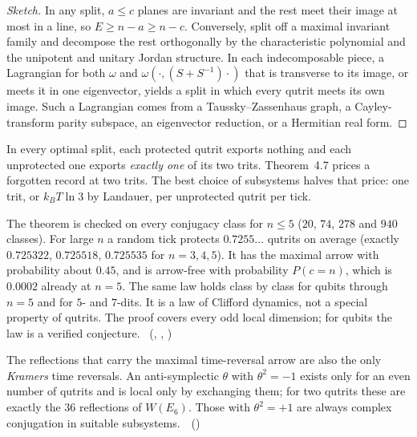 \begin{proof}[Sketch]
In any split, $a\le c$ planes are invariant and the rest meet their image at most in a line, so $E\ge n-a\ge n-c$.
Conversely, split off a maximal invariant family and decompose the rest orthogonally by the characteristic polynomial
and the unipotent and unitary Jordan structure. In each indecomposable piece, a Lagrangian for both $\omega$ and
$\omega(\cdot,(S+S^{-1})\cdot)$ that is transverse to its image, or meets it in one eigenvector, yields a split in which
every qutrit meets its own image. Such a Lagrangian comes from a Taussky--Zassenhaus graph, a Cayley-transform parity
subspace, an eigenvector reduction, or a Hermitian real form.
\end{proof}

In every optimal split, each protected qutrit exports nothing and each unprotected one exports \emph{exactly one} of its
two trits. Theorem~4.7 prices a forgotten record at two trits. The best choice of subsystems halves that price: one
trit, or $k_BT\ln3$ by Landauer, per unprotected qutrit per tick. \tierB

The theorem is checked on every conjugacy class for $n\le5$ ($20$, $74$, $278$ and $940$ classes). For large $n$ a random
tick protects $0.7255\ldots$ qutrits on average (exactly $0.725322$, $0.725518$, $0.725535$ for $n=3,4,5$). It has the
maximal arrow with probability about $0.45$, and is arrow-free with probability $P(c=n)$, which is $0.0002$ already at
$n=5$. The same law holds class by class for qubits through $n=5$ and for $5$- and $7$-dits. It is a law of Clifford
dynamics, not a special property of qutrits. The proof covers every odd local dimension; for qubits the law is a
verified conjecture. \tierC\ (, ,
)

The reflections that carry the maximal time-reversal arrow are also the only \emph{Kramers} time reversals. An
anti-symplectic $\theta$ with $\theta^2=-1$ exists only for an even number of qutrits and is local only by exchanging
them; for two qutrits these are exactly the $36$ reflections of $W(E_6)$. Those with $\theta^2=+1$ are always complex
conjugation in suitable subsystems. \tierT\,\tierC\ ()
